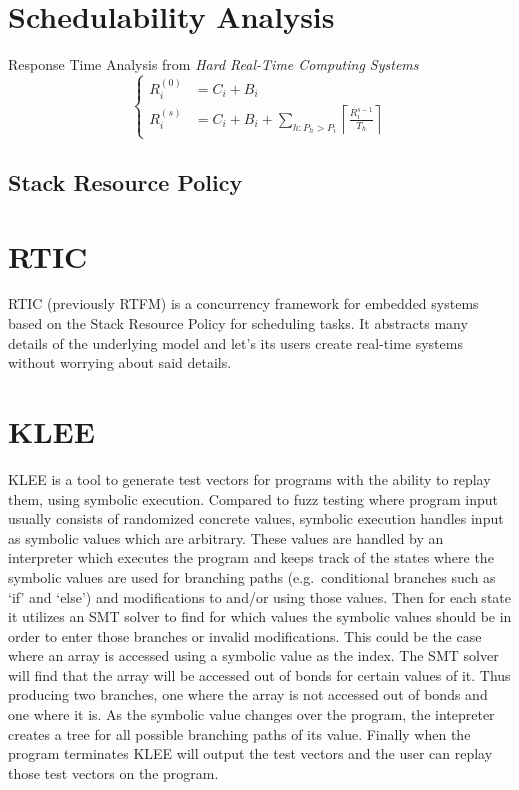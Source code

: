 \section{Schedulability Analysis}
Response Time Analysis from \textit{Hard Real-Time Computing Systems}\cite{hardrealtimecomputingsystems}
\begin{equation}
    \begin{cases}
        R_{i}^{(0)} &= C_i + B_i \\
        R_{i}^{(s)} &= C_i + B_i + \sum\limits_{h: P_h > P_i} \left\lceil \frac{R_{i}^{s-1}}{T_h} \right\rceil
    \end{cases}
\end{equation}
\subsection{Stack Resource Policy}


\section{RTIC}
RTIC (previously RTFM\cite{rtfm}) is a concurrency framework for embedded
systems based on the Stack Resource Policy\cite{srp} for scheduling tasks. It
abstracts many details of the underlying model and let's its users create
real-time systems without worrying about said details.

\section{KLEE}
KLEE\cite{kleepaper} is a tool to generate test vectors for programs with the
ability to replay them, using symbolic execution. Compared to fuzz testing
where program input usually consists of randomized concrete values, symbolic
execution handles input as symbolic values which are arbitrary. These values
are handled by an interpreter which executes the program and keeps track of the
states where the symbolic values are used for branching paths (e.g.\
conditional branches such as `if' and `else') and modifications to and/or using
those values. Then for each state it utilizes an SMT solver to find for which
values the symbolic values should be in order to enter those branches or invalid
modifications. This could be the case where an array is accessed using a
symbolic value as the index. The SMT solver will find that the array will be
accessed out of bonds for certain values of it. Thus producing two branches,
one where the array is not accessed out of bonds and one where it is. As the
symbolic value changes over the program, the intepreter creates a tree for all
possible branching paths of its value. Finally when the program terminates KLEE
will output the test vectors and the user can replay those test vectors on the
program.

